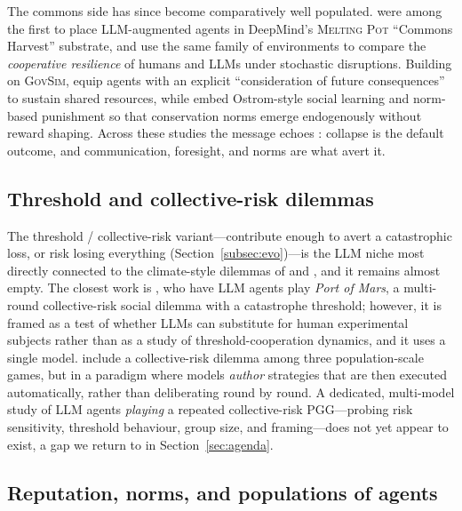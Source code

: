 \documentclass[11pt,a4paper]{article}
\begin{document}
The commons side has since become comparatively well populated.
\citet{mosquera2024meltingpot} were among the first to place LLM-augmented agents
in DeepMind's \textsc{Melting Pot} ``Commons Harvest'' substrate, and
\citet{chaconchamorro2025resilience} use the same family of environments to
compare the \emph{cooperative resilience} of humans and LLMs under stochastic
disruptions. Building on \textsc{GovSim}, \citet{nguyen2025navigating} equip
agents with an explicit ``consideration of future consequences'' to sustain shared
resources, while \citet{gupta2025social} embed Ostrom-style social learning and
norm-based punishment so that conservation norms emerge endogenously without reward
shaping. Across these studies the message echoes \citet{piatti2024govsim}:
collapse is the default outcome, and communication, foresight, and norms are what
avert it.

\subsection{Threshold and collective-risk dilemmas}

The threshold / collective-risk variant---contribute enough to avert a
catastrophic loss, or risk losing everything (Section~\ref{subsec:evo})---is the
LLM niche most directly connected to the climate-style dilemmas of
\citet{milinski2008collective} and \citet{santos2011risk}, and it remains almost
empty. The closest work is \citet{slumbers2025port}, who have LLM agents play
\emph{Port of Mars}, a multi-round collective-risk social dilemma with a
catastrophe threshold; however, it is framed as a test of whether LLMs can
substitute for human experimental subjects rather than as a study of
threshold-cooperation dynamics, and it uses a single model.
\citet{willis2026hundreds} include a collective-risk dilemma among three
population-scale games, but in a paradigm where models \emph{author} strategies
that are then executed automatically, rather than deliberating round by round. A
dedicated, multi-model study of LLM agents \emph{playing} a repeated
collective-risk PGG---probing risk sensitivity, threshold behaviour, group size,
and framing---does not yet appear to exist, a gap we return to in
Section~\ref{sec:agenda}.

\subsection{Reputation, norms, and populations of agents}
\end{document}
